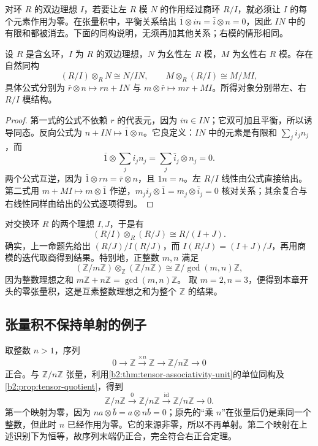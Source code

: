 \ProseParagraphBreak
对环 \(R\) 的双边理想 \(I\)，若要让左 \(R\) 模 \(N\) 的作用经过商环 \(R/I\)，就必须让 \(I\) 的每个元素作用为零。在张量积中，平衡关系给出 \(\bar1\otimes in=\bar i\otimes n=0\)，因此 \(IN\) 中的有限和都被消去。下面的同构说明，无须再加其他关系；右模的情形相同。

\begin{proposition}[商环上的张量计算]\label{b2:prop:tensor-quotient}
	设 \(R\) 是含幺环，\(I\) 为 \(R\) 的双边理想，\(N\) 为幺性左 \(R\) 模，\(M\) 为幺性右 \(R\) 模。存在自然同构
	\[
		(R/I)\otimes_RN\cong N/IN, \qquad M\otimes_R(R/I)\cong M/MI,
	\]
	具体公式分别为 \(\bar r\otimes n\mapsto rn+IN\) 与 \(m\otimes\bar r\mapsto mr+MI\)。所得对象分别带左、右 \(R/I\) 模结构。
\end{proposition}
\begin{proof}
	第一式的公式不依赖 \(r\) 的代表元，因为 \(i n\in IN\)；它双可加且平衡，所以诱导同态。反向公式为 \(n+IN\mapsto\bar1\otimes n\)。它良定义：\(IN\) 中的元素是有限和 \(\sum_j i_j n_j\)，而
	\[
		\bar1\otimes\sum_j i_j n_j =\sum_j\bar i_j\otimes n_j=0.
	\]
	两个公式互逆，因为 \(\bar1\otimes rn=\bar r\otimes n\)，且 \(1n=n\)。左 \(R/I\) 线性由公式直接给出。第二式用 \(m+MI\mapsto m\otimes\bar1\) 作逆，\(m_j i_j\otimes\bar1=m_j\otimes\bar i_j=0\) 核对关系；其余复合与右线性同样由给出的公式逐项得到。
\end{proof}

对交换环 \(R\) 的两个理想 \(I,J\)，于是有
\[
	(R/I)\otimes_R(R/J)\cong R/(I+J).
\]
确实，上一命题先给出 \((R/J)/I(R/J)\)，而 \(I(R/J)=(I+J)/J\)，再用商模的迭代取商得到结果。特别地，正整数 \(m,n\) 满足
\[
	(\mathbb Z/m\mathbb Z)\otimes_{\mathbb Z}(\mathbb Z/n\mathbb Z) \cong\mathbb Z/\gcd(m,n)\mathbb Z,
\]
因为整数理想之和 \(m\mathbb Z+n\mathbb Z=\gcd(m,n)\mathbb Z\)。 取 \(m=2,n=3\)，便得到本章开头的零张量积，这是互素整数理想之和为整个 \(\mathbb Z\) 的结果。

\subsection{张量积不保持单射的例子}
\label{b2:subsec:0604:02}

取整数 \(n>1\)，序列
\[
	0\longrightarrow\mathbb Z\xrightarrow{\times n}\mathbb Z \longrightarrow\mathbb Z/n\mathbb Z\longrightarrow0
\]
正合。与 \(\mathbb Z/n\mathbb Z\) 张量，利用\cref{b2:thm:tensor-associativity-unit}的单位同构及\cref{b2:prop:tensor-quotient}，得到
\[
	\mathbb Z/n\mathbb Z\xrightarrow{0}\mathbb Z/n\mathbb Z \xrightarrow{\operatorname{id}}\mathbb Z/n\mathbb Z\longrightarrow0.
\]
第一个映射为零，因为 \(n a\otimes\bar b=a\otimes n\bar b=0\)；原先的“乘 \(n\)”在张量后仍是乘同一个整数，但此时 \(n\) 已经作用为零。它的来源非零，所以不再单射。第二个映射在上述识别下为恒等，故序列末端仍正合，完全符合右正合定理。

